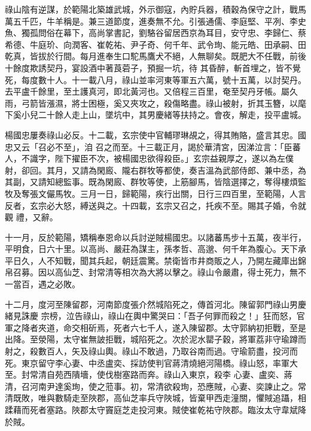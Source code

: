 \begin{pinyinscope}
 祿山陰有逆謀，於範陽北築雄武城，外示御寇，內貯兵器，積穀為保守之計，戰馬萬五千匹，牛羊稱是。兼三道節度，進奏無不允。引張通儒、李庭堅、平冽、李史魚、獨孤問俗在幕下，高尚掌書記，劉駱谷留居西京為耳目，安守忠、李歸仁、蔡希德、牛庭玠、向潤客、崔乾祐、尹子奇、何千年、武令珣、能元皓、田承嗣、田乾真，皆拔於行間。每月進奉生口駝馬鷹犬不絕，人無聊矣。既肥大不任戰，前後十餘度欺誘契丹，宴設酒中著莨菪子，預掘一坑，待
 其昏醉，斬首埋之，皆不覺死，每度數十人。十一載八月，祿山並率河東等軍五六萬，號十五萬，以討契丹。去平盧千餘里，至土護真河，即北黃河也。又倍程三百里，奄至契丹牙帳。屬久雨，弓箭皆漲濕，將士困極，奚又夾攻之，殺傷略盡。祿山被射，折其玉簪，以麾下奚小兒二十餘人走上山，墜坑中，其男慶緒等扶持之。會夜，解走，投平盧城。



 楊國忠屢奏祿山必反。十二載，玄宗使中官輔璆琳覘之，得其賄賂，盛言其忠。國忠又云「召必不至」，洎
 召之而至。十三載正月，謁於華清宮，因涕泣言：「臣蕃人，不識字，陛下擢臣不次，被楊國忠欲得殺臣。」玄宗益親厚之，遂以為左僕射，卻回。其月，又請為閑廄、隴右群牧等都使，奏吉溫為武部侍郎、兼中丞，為其副，又請知總監事。既為閑廄、群牧等使，上筋腳馬，皆陰選擇之，奪得樓煩監牧及奪張文儼馬牧。三月一日，歸範陽，疾行出關，日行三四百里，至範陽，人言反者，玄宗必大怒，縛送與之。十四載，玄宗又召之，托疾不至。賜其子婚，令就觀
 禮，又辭。



 十一月，反於範陽，矯稱奉恩命以兵討逆賊楊國忠。以諸蕃馬步十五萬，夜半行，平明食，日六十里。以高尚、嚴莊為謀主，孫孝哲、高邈、何千年為腹心。天下承平日久，人不知戰，聞其兵起，朝廷震驚。禁衛皆市井商販之人，乃開左藏庫出錦帛召募。因以高仙芝、封常清等相次為大將以擊之。祿山令嚴肅，得士死力，無不一當百，遇之必敗。



 十二月，度河至陳留郡，河南節度張介然城陷死之，傳首河北。陳留郭門祿山男慶緒見誅慶
 宗榜，泣告祿山，祿山在輿中驚哭曰：「吾子何罪而殺之！」狂而怒，官軍之降者夾道，命交相斫焉，死者六七千人，遂入陳留郡。太守郭納初拒戰，至是出降。至滎陽，太守崔無詖拒戰，城陷死之。次於泥水罌子穀，將軍荔非守瑜蹲而射之，殺數百人，矢及祿山輿。祿山不敢過，乃取谷南而過。守瑜箭盡，投河而死。東京留守李心妻、中丞盧奕、採訪使判官蔣清燒絕河陽橋。祿山怒，率軍大至。封常清自苑西隤墻，使伐樹塞路而奔。祿山入東京，殺李
 心妻、盧奕、蔣清，召河南尹達奚珣，使之蒞事。初，常清欲殺珣，恐應賊，心妻、奕諫止之。常清既敗，唯與數騎走至陜郡，高仙芝率兵守陜城，皆棄甲西走潼關，懼賊追躡，相蹂藉而死者塞路。陜郡太守竇庭芝走投河東。賊使崔乾祐守陜郡。臨汝太守韋斌降於賊。




\end{pinyinscope}
